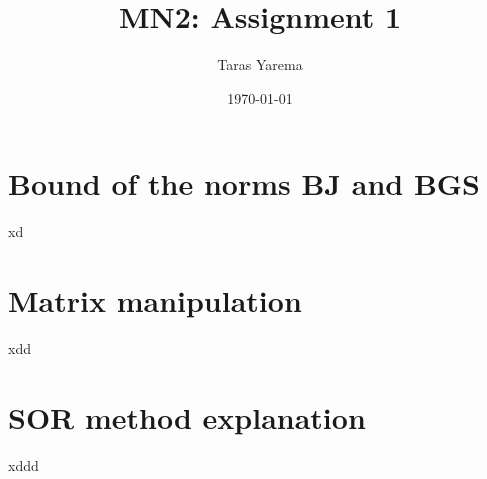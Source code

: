 \documentclass[12pt]{article}
\title{MN2: Assignment 1}
\author{Taras Yarema}
\date{\today}
\begin{document}
\maketitle

\section*{Bound of the norms BJ and BGS}

xd

\section*{Matrix manipulation}

xdd

\section*{SOR method explanation}

xddd

% 
% 
\end{document}
